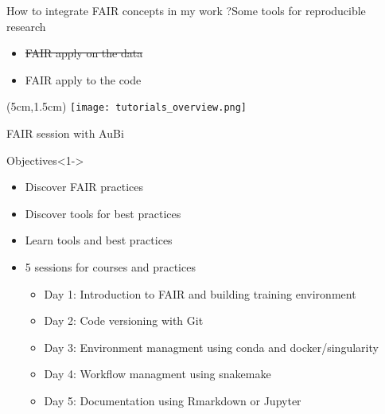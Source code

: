 \begin{frame}{How to integrate FAIR concepts in my work ?}{Some tools for reproducible research}
\begin{itemize}
\item {\sout{\color{gray} FAIR apply on the data}}
\item FAIR apply to the code
\end{itemize}
\begin{textblock*}{15cm}(5cm,1.5cm) %
\texttt{[image: tutorials\_overview.png]}
\end{textblock*}
\end{frame}

\begin{frame}{FAIR session with AuBi}
\begin{block}{Objectives}<1->
\begin{itemize}
\item Discover FAIR practices
\item Discover tools for best practices
\item Learn tools and best practices
\item<2-> 5 sessions for courses and practices
	\begin{itemize}[<2->]
	\item Day 1: Introduction to FAIR and building training environment
	\item Day 2: Code versioning with Git
	\item Day 3: Environment managment using conda and docker/singularity
	\item Day 4: Workflow managment using snakemake
	\item Day 5: Documentation using Rmarkdown or Jupyter
	\end{itemize}
\end{itemize}
\end{block}
\end{frame}

